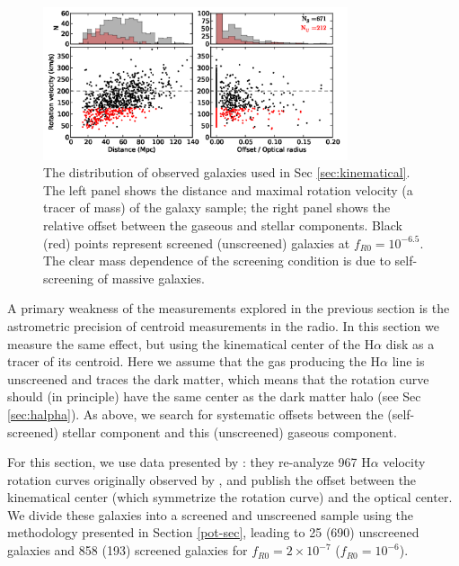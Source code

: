 \documentclass[useAMS,usenatbib,twocolumn]{mn2e}
\newcommand{\ha}{H$\alpha$}
\begin{document}
\begin{figure}
\begin{center}
  \includegraphics[width=0.8\textwidth]{figures/sec4_2_scatter.png}
  \caption{The distribution of observed galaxies used in Sec
    \ref{sec:kinematical}.  The left panel shows the distance and maximal
    rotation velocity (a tracer of mass) of the galaxy sample; the right
    panel shows the relative offset between the gaseous and stellar components.
    Black (red) points represent screened (unscreened) galaxies at
    $f_{R0} = 10^{-6.5}$.  The clear mass dependence of the screening condition
    is due to self-screening of massive galaxies.}
  \label{offset-kin-den-1}
\end{center}
\end{figure}

A primary weakness of the measurements explored in the previous section is
the astrometric precision of centroid measurements in the radio.  In
this section we measure the same effect, but using the kinematical
center of the \ha{} disk as a tracer of its centroid.  Here we assume that
the gas producing the \ha{} line is unscreened and traces the dark matter,
which means that the rotation curve should (in principle) have the same
center as the dark matter halo (see Sec \ref{sec:halpha}).
As above, we search for systematic offsets
between the (self-screened) stellar component and this (unscreened) gaseous
component.

For this section, we use data presented by \citet{persic1995}:
they re-analyze 967 \ha{} velocity rotation curves originally 
observed by \citet{mat92}, and publish the offset between the kinematical
center (which symmetrize the rotation curve) and the optical center.  We divide these galaxies into a screened
and unscreened sample using the methodology presented in Section \ref{pot-sec},
leading to 25 (690) unscreened galaxies and 858 (193) screened galaxies
for $f_{R0} = 2 \times 10^{-7}$ ($f_{R0} = 10^{-6}$).
\end{document}
